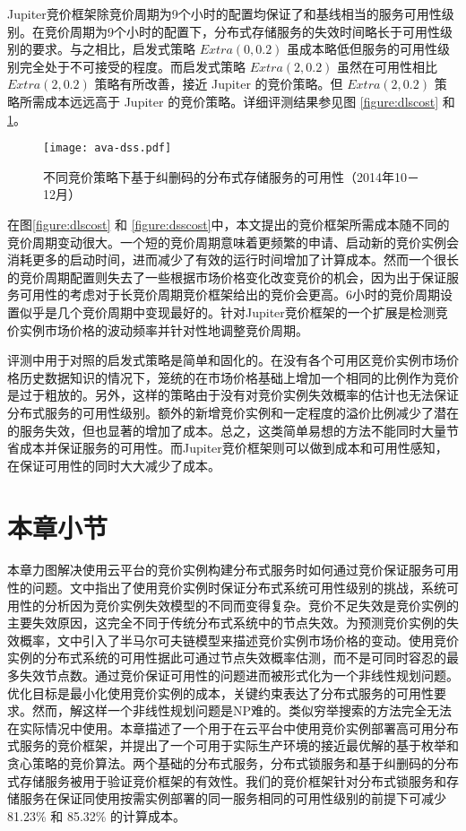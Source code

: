 Jupiter竞价框架除竞价周期为9个小时的配置均保证了和基线相当的服务可用性级别。在竞价周期为9个小时的配置下，分布式存储服务的失效时间略长于可用性级别的要求。与之相比，启发式策略 $Extra(0, 0.2)$ 虽成本略低但服务的可用性级别完全处于不可接受的程度。而启发式策略 $Extra(2, 0.2)$ 虽然在可用性相比 $Extra(2, 0.2)$ 策略有所改善，接近 Jupiter 的竞价策略。但 $Extra(2, 0.2)$ 策略所需成本远远高于 Jupiter 的竞价策略。详细评测结果参见图 \ref{figure:dlscost} 和 \ref{figure:dssavailability}。
\begin{figure}
  \centering
  \texttt{[image: ava-dss.pdf]}
  \caption{不同竞价策略下基于纠删码的分布式存储服务的可用性（2014年10－12月）}
  \label{figure:dssavailability}
\end{figure}

在图\ref{figure:dlscost} 和 \ref{figure:dsscost}中，本文提出的竞价框架所需成本随不同的竞价周期变动很大。一个短的竞价周期意味着更频繁的申请、启动新的竞价实例会消耗更多的启动时间，进而减少了有效的运行时间增加了计算成本。然而一个很长的竞价周期配置则失去了一些根据市场价格变化改变竞价的机会，因为出于保证服务可用性的考虑对于长竞价周期竞价框架给出的竞价会更高。6小时的竞价周期设置似乎是几个竞价周期中变现最好的。针对Jupiter竞价框架的一个扩展是检测竞价实例市场价格的波动频率并针对性地调整竞价周期。

评测中用于对照的启发式策略是简单和固化的。在没有各个可用区竞价实例市场价格历史数据知识的情况下，笼统的在市场价格基础上增加一个相同的比例作为竞价是过于粗放的。另外，这样的策略由于没有对竞价实例失效概率的估计也无法保证分布式服务的可用性级别。额外的新增竞价实例和一定程度的溢价比例减少了潜在的服务失效，但也显著的增加了成本。总之，这类简单易想的方法不能同时大量节省成本并保证服务的可用性。而Jupiter竞价框架则可以做到成本和可用性感知，在保证可用性的同时大大减少了成本。

\section{本章小节}
\label{sec:jupiter-conclusion}
本章力图解决使用云平台的竞价实例构建分布式服务时如何通过竞价保证服务可用性的问题。文中指出了使用竞价实例时保证分布式系统可用性级别的挑战，系统可用性的分析因为竞价实例失效模型的不同而变得复杂。竞价不足失效是竞价实例的主要失效原因，这完全不同于传统分布式系统中的节点失效。为预测竞价实例的失效概率，文中引入了半马尔可夫链模型来描述竞价实例市场价格的变动。使用竞价实例的分布式系统的可用性据此可通过节点失效概率估测，而不是可同时容忍的最多失效节点数。通过竞价保证可用性的问题进而被形式化为一个非线性规划问题。优化目标是最小化使用竞价实例的成本，关键约束表达了分布式服务的可用性要求。然而，解这样一个非线性规划问题是NP难的。类似穷举搜索的方法完全无法在实际情况中使用。本章描述了一个用于在云平台中使用竞价实例部署高可用分布式服务的竞价框架，并提出了一个可用于实际生产环境的接近最优解的基于枚举和贪心策略的竞价算法。两个基础的分布式服务，分布式锁服务和基于纠删码的分布式存储服务被用于验证竞价框架的有效性。我们的竞价框架针对分布式锁服务和存储服务在保证同使用按需实例部署的同一服务相同的可用性级别的前提下可减少81.23\% 和 85.32\% 的计算成本。
